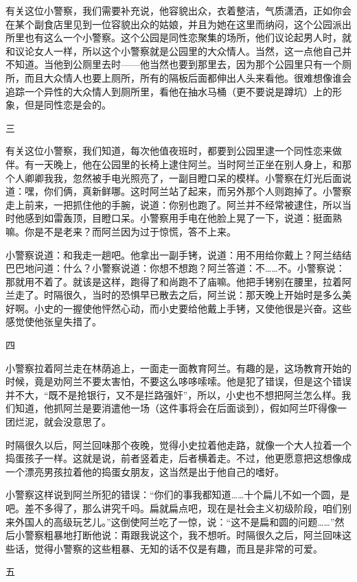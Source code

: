 有关这位小警察，我们需要补充说，他容貌出众，衣着整洁，气质潇洒，正如你会在某个副食店里见到一位容貌出众的姑娘，并且为她在这里而纳闷，这个公园派出所里也有这么一个小警察。这个公园是同性恋聚集的场所，他们议论起男人时，就和议论女人一样，所以这个小警察就是公园里的大众情人。当然，这一点他自己并不知道。当他到公厕里去时——他当然也要到那里去，因为那个公园里只有一个厕所，而且大众情人也要上厕所，所有的隔板后面都伸出人头来看他。很难想像谁会追踪一个异性的大众情人到厕所里，看他在抽水马桶（更不要说是蹲坑）上的形象，但是同性恋是会的。 

三 

有关这位小警察，我们知道，每次他值夜班时，都要到公园里逮一个同性恋来做伴。有一天晚上，他在公园里的长椅上逮住阿兰。当时阿兰正坐在别人身上，和那个人卿卿我我，忽然被手电光照亮了，一副目瞪口呆的模样。小警察在灯光后面说道：嘿，你们俩，真新鲜哪。这时阿兰站了起来，而另外那个人则跑掉了。小警察走上前来，一把抓住他的手腕，说道：你别也跑了。阿兰并不经常被逮住，所以当时他感到如雷轰顶，目瞪口呆。小警察用手电在他脸上晃了一下，说道：挺面熟嘛。你是不是老来？而阿兰因为过于惊慌，答不上来。 

小警察说道：和我走一趟吧。他拿出一副手铐，说道：用不用给你戴上？阿兰结结巴巴地问道：什么？小警察说道：你想不想跑？阿兰答道：不……不。小警察说：那就用不着了。就该是这样，跑得了和尚跑不了庙嘛。他把手铐别在腰里，拉着阿兰走了。时隔很久，当时的恐惧早已散去之后，阿兰说：那天晚上开始时是多么美好啊。小史的一握使他怦然心动，而小史要给他戴上手铐，又使他很是兴奋。这些感觉使他张皇失措了。 

四 

小警察拉着阿兰走在林荫追上，一面走一面教育阿兰。有趣的是，这场教育开始的时候，竟是劝阿兰不要太害怕，不要这么哆哆嗦嗦。他是犯了错误，但是这个错误并不大，“既不是抢银行，又不是拦路强奸”，所以，小史也不想把阿兰怎么样。我们知道，他抓阿兰是要消遣他一场（这件事将会在后面谈到），假如阿兰吓得像一团烂泥，就会没意思了。 

时隔很久以后，阿兰回味那个夜晚，觉得小史拉着他走路，就像一个大人拉着一个捣蛋孩子一样。这就是说，前者竖着走，后者横着走。不过，他更愿意把这想像成一个漂亮男孩拉着他的捣蛋女朋友，这当然是出于他自己的嗜好。 

小警察这样说到阿兰所犯的错误：“你们的事我都知道……十个扁儿不如一个圆，是吧。差不多得了，那么讲究千吗。扁就扁点吧，现在是社会主义初级阶段，咱们别来外国人的高级玩艺儿。”这倒使阿兰吃了一惊，说：“这不是扁和圆的问题……”然后小警察粗暴地打断他说：甭跟我说这个，我不想听。时隔很久之后，阿兰回味这些话，觉得小警察的这些粗暴、无知的话不仅是有趣，而且是非常的可爱。 

五 

